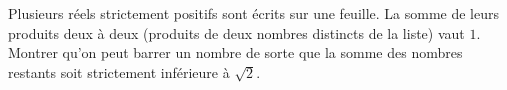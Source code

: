 Plusieurs réels strictement positifs sont écrits sur une feuille. La somme de leurs produits deux à deux (produits de deux nombres distincts de la liste) vaut $1$. Montrer qu'on peut barrer un nombre de sorte que la somme des nombres restants soit strictement inférieure à $\sqrt{2}$.
